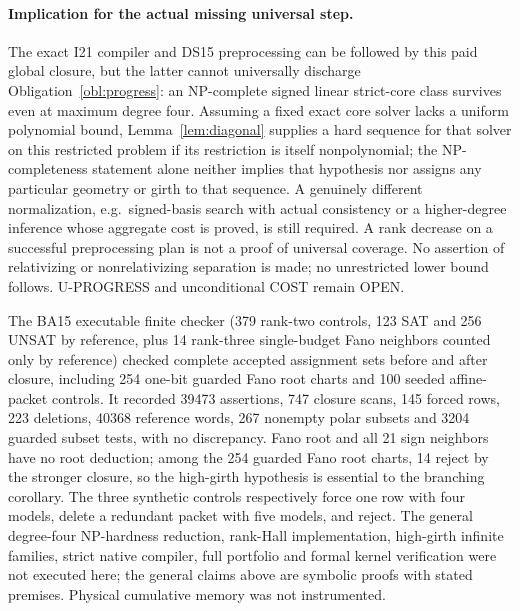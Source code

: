 \documentclass[11pt]{article}
\begin{document}
\paragraph{Implication for the actual missing universal step.}
The exact I21 compiler and DS15 preprocessing can be followed by this paid global closure, but the latter cannot universally discharge Obligation~\ref{obl:progress}: an NP-complete signed linear strict-core class survives even at maximum degree four. Assuming a fixed exact core solver lacks a uniform polynomial bound, Lemma~\ref{lem:diagonal} supplies a hard sequence for that solver on this restricted problem if its restriction is itself nonpolynomial; the NP-completeness statement alone neither implies that hypothesis nor assigns any particular geometry or girth to that sequence. A genuinely different normalization, e.g.\ signed-basis search with actual consistency or a higher-degree inference whose aggregate cost is proved, is still required. A rank decrease on a successful preprocessing plan is not a proof of universal coverage. No assertion of relativizing or nonrelativizing separation is made; no unrestricted lower bound follows. U-PROGRESS and unconditional COST remain OPEN.

The BA15 executable finite checker (379 rank-two controls, 123 SAT and 256 UNSAT by reference, plus 14 rank-three single-budget Fano neighbors counted only by reference) checked complete accepted assignment sets before and after closure, including 254 one-bit guarded Fano root charts and 100 seeded affine-packet controls. It recorded 39473 assertions, 747 closure scans, 145 forced rows, 223 deletions, 40368 reference words, 267 nonempty polar subsets and 3204 guarded subset tests, with no discrepancy. Fano root and all 21 sign neighbors have no root deduction; among the 254 guarded Fano root charts, 14 reject by the stronger closure, so the high-girth hypothesis is essential to the branching corollary. The three synthetic controls respectively force one row with four models, delete a redundant packet with five models, and reject. The general degree-four NP-hardness reduction, rank-Hall implementation, high-girth infinite families, strict native compiler, full portfolio and formal kernel verification were not executed here; the general claims above are symbolic proofs with stated premises. Physical cumulative memory was not instrumented.
\end{document}
